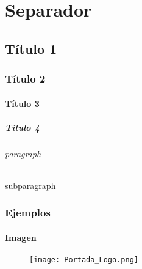 \documentclass[12pt, twoside, openright]{report} %
\begin{document}


\part{Separador}
\chapter{Título 1}
\section{Título 2}
\subsection{Título 3}
\subsubsection{Título 4}
\paragraph{paragraph}
\subparagraph{subparagraph}

\newpage

\section{Ejemplos}

\subsection{Imagen}
\begin{figure}[H]
	{\texttt{[image: Portada\_Logo.png]}}
\end{figure}
\end{document}
